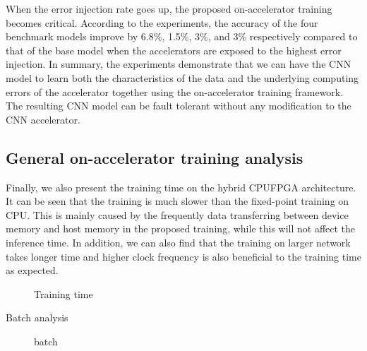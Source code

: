 When the error injection rate goes up, the proposed on-accelerator training becomes critical. 
According to the experiments, the accuracy of the four benchmark models improve by 6.8\%, 1.5\%, 3\%, and 3\% 
respectively compared to that of the base model when the accelerators are exposed to the highest 
error injection. In summary, the experiments demonstrate that we can have the CNN model to learn 
both the characteristics of the data and the underlying computing errors of the accelerator 
together using the on-accelerator training framework. The resulting CNN model can be fault tolerant 
without any modification to the CNN accelerator.  

\subsection{General on-accelerator training analysis}
  Finally, we also present the training time on the hybrid CPUFPGA architecture. 
It can be seen that the training is much slower than the fixed-point training on CPU. 
This is mainly caused by the frequently data transferring between device memory and host 
memory in the proposed training, while this will not affect the inference time. In addition, 
we can also find that the training on larger network takes longer time and higher clock frequency 
is also beneficial to the training time as expected. 

\begin{figure}
        \caption{Training time}
        \label{fig:time}
\end{figure}

Batch analysis

\begin{figure}
        \caption{batch}
        \label{fig:batch}
\end{figure}
